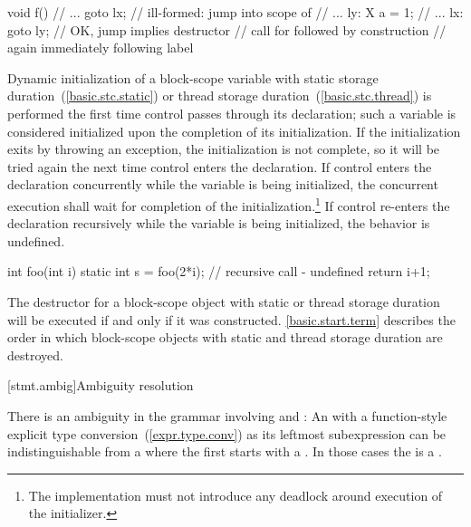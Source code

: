 \begin{codeblock}
void f() {
  // ... 
  goto lx;          // ill-formed: jump into scope of 
  // ...
ly:
  X a = 1;
  // ...
lx:
  goto ly;          // OK, jump implies destructor
                    // call for  followed by construction
                    // again immediately following label 
}
\end{codeblock}
\exitexample

\pnum
{}%
%
%
%
Dynamic initialization of a block-scope variable with
static storage duration~(\ref{basic.stc.static}) or
thread storage duration~(\ref{basic.stc.thread}) is performed
the first time control passes through its declaration; such a variable is
considered initialized upon the completion of its initialization. If the
initialization exits by throwing an exception, the initialization is not
complete, so it will be tried again the next time control enters the
declaration. If control enters the declaration concurrently while the variable is being initialized, the concurrent execution shall wait for completion of the initialization.\footnote{The implementation must not introduce any deadlock around execution of the initializer.} If control re-enters the declaration recursively while
the variable is being initialized, the behavior is undefined.
\enterexample

\begin{codeblock}
int foo(int i) {
  static int s = foo(2*i);      // recursive call - undefined
  return i+1;
}
\end{codeblock}
\exitexample

\pnum
{}%
The destructor for a block-scope object with static or thread storage duration will be
executed if and only if it was constructed.
\enternote
\ref{basic.start.term} describes the order in which block-scope objects with
static and thread storage duration are destroyed.
\exitnote

[stmt.ambig]{Ambiguity resolution}%

\pnum
There is an ambiguity in the grammar involving
 and : An
 with a function-style explicit type
conversion~(\ref{expr.type.conv}) as its leftmost subexpression can be
indistinguishable from a  where the first
 starts with a \tcode{(}. In those cases the
 is a .

